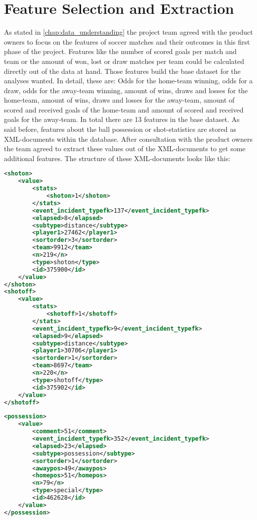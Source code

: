 
\chapter{Feature Selection and Extraction}
\label{chap:feature_selection_and_extraction}
As stated in \autoref{chap:data_understanding} the project team agreed with the product owners to focus on the features of soccer matches and their outcomes in this first phase of the project. Features like the number of scored goals per match and team or the amount of won, lost or draw matches per team could be calculated directly out of the data at hand. Those features build the base dataset for the analyses wanted. In detail, these are: Odds for the home-team winning, odds for a draw, odds for the away-team winning, amount of wins, draws and losses for the home-team, amount of wins, draws and losses for the away-team, amount of scored and received goals of the home-team and amount of scored and received goals for the away-team. In total there are 13 features in the base dataset.
\newline
As said before, features about the ball possession or shot-statistics are stored as XML-documents within the database. After consultation with the product owners the team agreed to extract these values out of the XML-documents to get some additional features. The structure of these XML-documents looks like this:
\\
\begin{lstlisting}[language=XML, caption=XML structure of shot-statistics]
<shoton>
	<value>
		<stats>
			<shoton>1</shoton>
		</stats>
		<event_incident_typefk>137</event_incident_typefk>
		<elapsed>8</elapsed>
		<subtype>distance</subtype>
		<player1>27462</player1>
		<sortorder>3</sortorder>
		<team>9912</team>
		<n>219</n>
		<type>shoton</type>
		<id>375900</id>
	</value>
</shoton>
<shotoff>
	<value>
		<stats>
			<shotoff>1</shotoff>
		</stats>
		<event_incident_typefk>9</event_incident_typefk>
		<elapsed>9</elapsed>
		<subtype>distance</subtype>
		<player1>30706</player1>
		<sortorder>1</sortorder>
		<team>8697</team>
		<n>220</n>
		<type>shotoff</type>
		<id>375902</id>
	</value>
</shotoff>
\end{lstlisting}

\begin{lstlisting}[language=XML, caption=XML structure of ball-possession-statistics]
<possession>
	<value>
		<comment>51</comment>
		<event_incident_typefk>352</event_incident_typefk>
		<elapsed>23</elapsed>
		<subtype>possession</subtype>
		<sortorder>1</sortorder>
		<awaypos>49</awaypos>
		<homepos>51</homepos>
		<n>79</n>
		<type>special</type>
		<id>462628</id>
	</value>
</possession>
\end{lstlisting}

